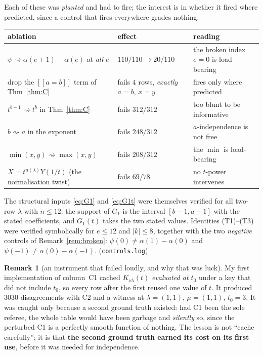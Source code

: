 \documentclass[11pt]{article}
\theoremstyle{definition}
\newtheorem{remark}[theorem]{Remark}
\newcommand{\lam}{\lambda}
\newcommand{\lb}{[\![}
\newcommand{\rb}{]\!]}
\begin{document}
Each of these was \emph{planted} and had to fire; the interest is in whether it fired where
predicted, since a control that fires everywhere grades nothing.
\begin{center}
\begin{tabular}{lll}
\toprule
ablation & effect & reading\\ \midrule
$\psi\rightsquigarrow\alpha(e{+}1)-\alpha(e)$ at \emph{all} $e$ &
  $110/110\to20/110$ & the broken index $e=0$ is load-bearing\\
drop the $\lb a=b\rb$ term of Thm~\ref{thm:C} &
  fails $4$ rows, \emph{exactly} $a{=}b{,}\,x{=}y$ & fires only where predicted\\
$t^{b-1}\rightsquigarrow t^{b}$ in Thm~\ref{thm:C} & fails $312/312$ & too blunt to be informative\\
$b\rightsquigarrow a$ in the exponent & fails $248/312$ & $a$-independence is not free\\
$\min(x,y)\rightsquigarrow\max(x,y)$ & fails $208/312$ & the $\min$ is load-bearing\\
$X=t^{n(\lam)}Y(1/t)$ (the normalisation twist) & fails $69/78$ & no $t$-power intervenes\\
\bottomrule
\end{tabular}
\end{center}
The structural inputs \eqref{eq:G1} and \eqref{eq:G1t} were themselves verified for all two-row
$\lam$ with $n\le12$: the support of $G_1$ is the interval $[b-1,a-1]$ with the stated
coefficients, and $G_1(t)$ takes the two stated values. Identities (T1)--(T3) were verified
symbolically for $e\le12$ and $|k|\le8$, together with the two \emph{negative} controls of
Remark~\ref{rem:broken}: $\psi(0)\ne\alpha(1)-\alpha(0)$ and $\psi(-1)\ne\alpha(0)-\alpha(-1)$.
(\texttt{controls.log})

\begin{remark}[an instrument that failed loudly, and why that was luck]
My first implementation of column~C1 cached $K_{\nu\lam}(t)$ \emph{evaluated at $t_0$} under a key
that did not include $t_0$, so every row after the first reused one value of $t$. It produced
$3030$ disagreements with C2 and a witness at $\lam=(1,1)$, $\mu=(1,1)$, $t_0=3$. It was caught
only because a second ground truth existed: had C1 been the sole referee, the whole table would
have been garbage and \emph{silently} so, since the perturbed C1 is a perfectly smooth function of
nothing. The lesson is not ``cache carefully''; it is that \textbf{the second ground truth earned
its cost on its first use}, before it was needed for independence.
\end{remark}
\end{document}

